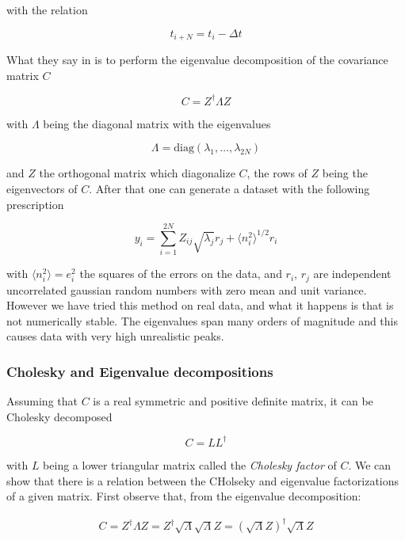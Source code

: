 with the relation

\begin{equation}
t_{i+N} = t_i - \Delta t
\end{equation}

What they say in \cite{Press1992} is to perform the eigenvalue decomposition of the covariance matrix $C$

\begin{equation}\label{eq:eigen-cov-decomp}
C = Z^\dagger \Lambda Z
\end{equation}

with $\Lambda$ being the diagonal matrix with the eigenvalues

\[
\Lambda = \mathrm{diag} \left ( \lambda_1, \dots, \lambda_{2N} \right )
\]
 
 and $Z$ the orthogonal matrix which diagonalize $C$, the rows of $Z$ being the eigenvectors of $C$. After that one can generate a dataset with the following prescription
 
\begin{equation}
y_i = \sum_{i=1}^{2N} Z_{ij} \sqrt{\lambda_j} r_j + \langle n_i^2 \rangle^{1/2} r_i
\end{equation}

with $ \langle n_i^2 \rangle = e_i^2$ the squares of the errors on the data, and $r_i$, $r_j$ are independent uncorrelated gaussian random numbers with zero mean and unit variance. However we have tried this method on real data, and what it happens is that is not numerically stable. The eigenvalues span many orders of magnitude and this causes data with very high unrealistic peaks.

\subsubsection{Cholesky and Eigenvalue decompositions}

Assuming that $C$ is a real symmetric and positive definite matrix, it can be Cholesky decomposed

\begin{equation}
C = L L^{\dagger}
\end{equation}

with $L$ being a lower triangular matrix called the \emph{Cholesky factor} of $C$. We can show that there is a relation between the CHolseky and eigenvalue factorizations of a given matrix. First observe that, from the eigenvalue decomposition:

\begin{align*}
C = Z^\dagger \Lambda Z = Z^\dagger \sqrt{\Lambda} \sqrt{\Lambda} Z = \left ( \sqrt{\Lambda} Z \right )^{\dagger} \sqrt{\Lambda} Z
\end{align*}

